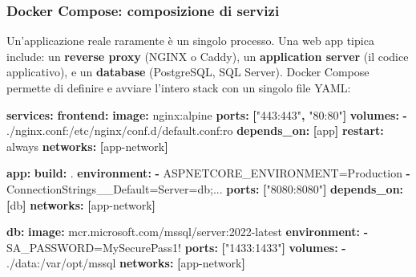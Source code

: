 \documentclass[
  italian,
  openany]{book}
\newenvironment{Shaded}{\begin{snugshade}}{\end{snugshade}}
\newcommand{\AttributeTok}[1]{\textcolor[rgb]{0.13,0.29,0.53}{#1}}
\newcommand{\FunctionTok}[1]{\textcolor[rgb]{0.13,0.29,0.53}{\textbf{#1}}}
\newcommand{\KeywordTok}[1]{\textcolor[rgb]{0.13,0.29,0.53}{\textbf{#1}}}
\newcommand{\StringTok}[1]{\textcolor[rgb]{0.31,0.60,0.02}{#1}}
\begin{document}
\subsubsection{Docker Compose: composizione di
servizi}\label{docker-compose-composizione-di-servizi}

Un'applicazione reale raramente è un singolo processo. Una web app
tipica include: un \textbf{reverse proxy} (NGINX o Caddy), un
\textbf{application server} (il codice applicativo), e un
\textbf{database} (PostgreSQL, SQL Server). Docker Compose permette di
definire e avviare l'intero stack con un singolo file YAML:

\begin{Shaded}
\begin{Highlighting}[]
\FunctionTok{services}\KeywordTok{:}
\AttributeTok{  }\FunctionTok{frontend}\KeywordTok{:}
\AttributeTok{    }\FunctionTok{image}\KeywordTok{:}\AttributeTok{ nginx:alpine}
\AttributeTok{    }\FunctionTok{ports}\KeywordTok{:}\AttributeTok{ }\KeywordTok{[}\StringTok{"443:443"}\KeywordTok{,}\AttributeTok{ }\StringTok{"80:80"}\KeywordTok{]}
\AttributeTok{    }\FunctionTok{volumes}\KeywordTok{:}
\AttributeTok{      }\KeywordTok{{-}}\AttributeTok{ ./nginx.conf:/etc/nginx/conf.d/default.conf:ro}
\AttributeTok{    }\FunctionTok{depends\_on}\KeywordTok{:}\AttributeTok{ }\KeywordTok{[}\AttributeTok{app}\KeywordTok{]}
\AttributeTok{    }\FunctionTok{restart}\KeywordTok{:}\AttributeTok{ always}
\AttributeTok{    }\FunctionTok{networks}\KeywordTok{:}\AttributeTok{ }\KeywordTok{[}\AttributeTok{app{-}network}\KeywordTok{]}

\AttributeTok{  }\FunctionTok{app}\KeywordTok{:}
\AttributeTok{    }\FunctionTok{build}\KeywordTok{:}\AttributeTok{ .}
\AttributeTok{    }\FunctionTok{environment}\KeywordTok{:}
\AttributeTok{      }\KeywordTok{{-}}\AttributeTok{ ASPNETCORE\_ENVIRONMENT=Production}
\AttributeTok{      }\KeywordTok{{-}}\AttributeTok{ ConnectionStrings\_\_Default=Server=db;...}
\AttributeTok{    }\FunctionTok{ports}\KeywordTok{:}\AttributeTok{ }\KeywordTok{[}\StringTok{"8080:8080"}\KeywordTok{]}
\AttributeTok{    }\FunctionTok{depends\_on}\KeywordTok{:}\AttributeTok{ }\KeywordTok{[}\AttributeTok{db}\KeywordTok{]}
\AttributeTok{    }\FunctionTok{networks}\KeywordTok{:}\AttributeTok{ }\KeywordTok{[}\AttributeTok{app{-}network}\KeywordTok{]}

\AttributeTok{  }\FunctionTok{db}\KeywordTok{:}
\AttributeTok{    }\FunctionTok{image}\KeywordTok{:}\AttributeTok{ mcr.microsoft.com/mssql/server:2022{-}latest}
\AttributeTok{    }\FunctionTok{environment}\KeywordTok{:}
\AttributeTok{      }\KeywordTok{{-}}\AttributeTok{ SA\_PASSWORD=MySecurePass1!}
\AttributeTok{    }\FunctionTok{ports}\KeywordTok{:}\AttributeTok{ }\KeywordTok{[}\StringTok{"1433:1433"}\KeywordTok{]}
\AttributeTok{    }\FunctionTok{volumes}\KeywordTok{:}
\AttributeTok{      }\KeywordTok{{-}}\AttributeTok{ ./data:/var/opt/mssql}
\AttributeTok{    }\FunctionTok{networks}\KeywordTok{:}\AttributeTok{ }\KeywordTok{[}\AttributeTok{app{-}network}\KeywordTok{]}


\end{Highlighting}
\end{Shaded}
\end{document}
